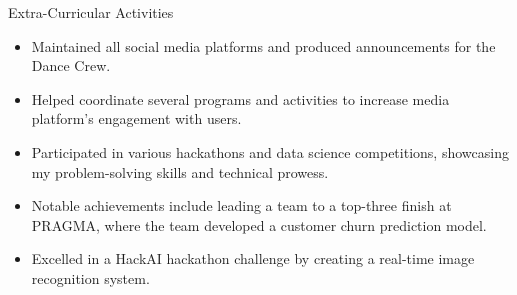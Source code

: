 \documentclass{resume} %
\begin{document}
\begin{rSection}{Extra-Curricular Activities} 
\vspace{0em}
\begin{itemize}
    \itemsep -6pt {} 
     \item Maintained all social media platforms and produced announcements for the Dance Crew.
     \item Helped coordinate several programs and activities to increase media platform's engagement with users.
     \item Participated in various hackathons and data science competitions, showcasing my problem-solving skills and technical prowess.
     \item Notable achievements include leading a team to a top-three finish at PRAGMA, where the team developed a customer churn prediction model.
     \item Excelled in a HackAI hackathon challenge by creating a real-time image recognition system.
 \end{itemize}


\end{rSection}



\end{document}
